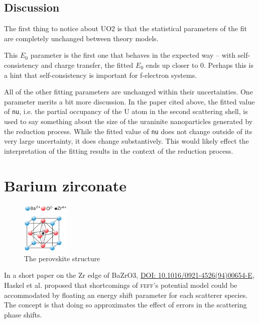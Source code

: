 \documentclass[11pt]{article}
\begin{document}
\subsection{Discussion}
\label{sec:orgheadline24}

The first thing to notice about UO2 is that the statistical parameters
of the fit are completely unchanged between theory models.

This $E_0$ parameter is the first one that behaves in the expected way --
with self-consistency and charge transfer, the fitted $E_0$ ends up
closer to 0. Perhaps this is a hint that self-consistency is important
for f-electron systems.

All of the other fitting parameters are unchanged within their
uncertainties. One parameter merits a bit more discussion. In the
paper cited above, the fitted value of \texttt{nu}, i.e. the partial
occupancy of the U atom in the second scattering shell, is used to say
something about the size of the uraninite nanoparticles generated by
the reduction process. While the fitted value of \texttt{nu} does not
change outside of its very large uncertainty, it does change
substantively. This would likely effect the interpretation of the
fitting results in the context of the reduction process.


\section{Barium zirconate}
\label{sec:orgheadline31}

\begin{figure}
  \begin{center}
    \includegraphics[width=0.2\textwidth]{BaZrO3/perovskite.png}
  \end{center}
  \caption{The perovskite structure}
\end{figure}


In a short paper on the Zr edge of BaZrO3,
\href{http://dx.doi.org/10.1016/0921-4526(94)00654-E}{DOI:
  10.1016/0921-4526(94)00654-E}, Haskel et al. proposed that
shortcomings of \textsc{feff}'s potential model could be accommodated by
floating an energy shift parameter for each scatterer species. The
concept is that doing so approximates the effect of errors in the
scattering phase shifts.
\end{document}
